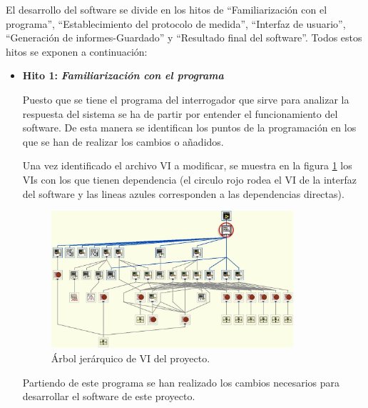 El desarrollo del software se divide en los hitos de ``Familiarización con el programa'', ``Establecimiento del protocolo de medida'', ``Interfaz de usuario'', ``Generación de informes-Guardado'' y ``Resultado final del software''. Todos estos hitos se exponen a continuación:

		\clearpage


\begin{itemize} [label=]
	\item \textbf{Hito 1:} \textit{\textbf{Familiarización con el programa}}
	
	Puesto que se tiene el programa del interrogador que sirve para analizar la respuesta del sistema se ha de partir por entender el funcionamiento del software. De esta manera se identifican los puntos de la programación en los que se han de realizar los cambios o añadidos. 
	
	Una vez identificado el archivo VI a modificar, se muestra en la figura \ref{fig:hierarchy} los VIs con los que tienen dependencia (el circulo rojo rodea el VI de la interfaz del software y las lineas azules corresponden a las dependencias directas).
	
	\begin{figure}[H]
		\centering
		\includegraphics[width=0.85\textwidth]{./img/hierarchyLV}
		\caption{Árbol jerárquico de VI del proyecto.} 
		\label{fig:hierarchy}
	\end{figure}  
	
	Partiendo de este programa se han realizado los cambios necesarios para desarrollar el software de este proyecto.
	
	

\end{itemize}
